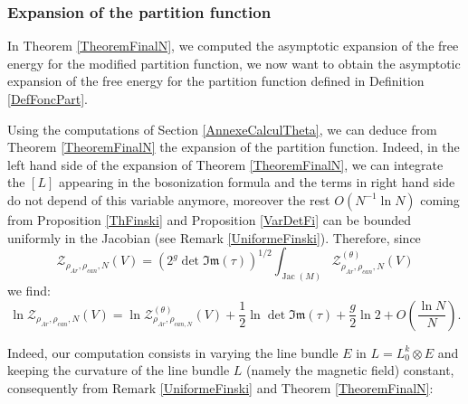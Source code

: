 \documentclass{article}
\theoremstyle{definition}
\theoremstyle{remark}
\DeclareMathOperator{\Jac}{Jac}
\begin{document}
\subsubsection{Expansion of the partition function}\label{SectionFinal}
In Theorem \ref{TheoremFinalN}, we computed the asymptotic expansion of the free energy for the modified partition function, we now want to obtain the asymptotic expansion of the free energy for the partition function defined in Definition \ref{DefFoncPart}. 

Using the computations of Section \ref{AnnexeCalculTheta}, we can deduce from Theorem \ref{TheoremFinalN} the expansion of the partition function. Indeed, in the left hand side of the expansion of Theorem \ref{TheoremFinalN}, we can integrate the $[L]$ appearing in the bosonization formula and the terms in right hand side do not depend of this variable anymore, moreover the rest $O\left(N^{-1}\ln N \right)$ coming from Proposition \ref{ThFinski} and Proposition \ref{VarDetFi} can be bounded uniformly in the Jacobian (see Remark \ref{UniformeFinski}). Therefore, since $$\mathcal{Z}_{\rho_{Ar},\rho_{can},N}(V)=(2^{g}\det \mathfrak{Im}(\tau))^{1/2}\int_{\Jac(M)}\mathcal{Z}^{(\theta)}_{\rho_{Ar},\rho_{can},N}(V)$$ we find: $$\ln \mathcal{Z}_{\rho_{Ar},\rho_{can},N}(V)=\ln \mathcal{Z}_{\rho_{Ar},\rho_{can,N}}^{(\theta)}(V)+\frac{1}{2}\ln\det\mathfrak{Im}(\tau)+\frac{g}{2}\ln2+O\left(\frac{\ln N}{N} \right).$$

Indeed, our computation consists in varying the line bundle $E$ in $L=L_{0}^{k}\otimes E$ and keeping the curvature  of the line bundle $L$ (namely the magnetic field) constant, consequently from Remark \ref{UniformeFinski} and Theorem \ref{TheoremFinalN}: 
\end{document}
